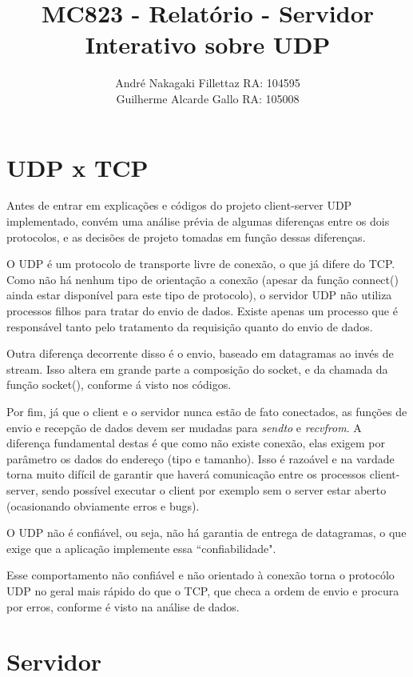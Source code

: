 \documentclass[10pt,a4paper]{report}
\author{André Nakagaki Fillettaz RA: 104595 \\ Guilherme Alcarde Gallo RA: 105008}
\title{MC823 - Relat\'orio - Servidor Interativo sobre UDP}
\begin{document}
\maketitle

\tableofcontents



\chapter{UDP x TCP}

	Antes de entrar em explicações e códigos do projeto client-server UDP implementado, convém uma análise prévia de algumas diferenças entre os dois protocolos, e as decisões de projeto tomadas em função dessas diferenças.

	O UDP é um protocolo de transporte livre de conexão, o que já difere do TCP. Como não há nenhum tipo de orientação a conexão (apesar da função connect() ainda estar disponível para este tipo de protocolo), o servidor UDP não utiliza processos filhos para tratar do envio de dados. Existe apenas um processo que é responsável tanto pelo tratamento da requisição quanto do envio de dados.
	
	Outra diferença decorrente disso é o envio, baseado em datagramas ao invés de stream. Isso altera em grande parte a composição do socket, e da chamada da função socket(), conforme á visto nos códigos.
	
	Por fim, já que o client e o servidor nunca estão de fato conectados, as funções de envio e recepção de dados devem ser mudadas para \textit{sendto} e \textit{recvfrom}. A diferença fundamental destas é que como não existe conexão, elas exigem por parâmetro os dados do endereço (tipo e tamanho). Isso é razoável e na vardade torna muito difícil de garantir que haverá comunicação entre os processos client-server, sendo possível executar o client por exemplo sem o server estar aberto (ocasionando obviamente erros e bugs).
	
	O UDP não é confiável, ou seja, não há garantia de entrega de datagramas, o que exige que a aplicação implemente essa “confiabilidade".
	
	Esse comportamento não confiável e não orientado à conexão torna o protocólo UDP no geral mais rápido do que o TCP, que checa a ordem de envio e procura por erros, conforme é visto na análise de dados.

\chapter{Servidor}
\end{document}
